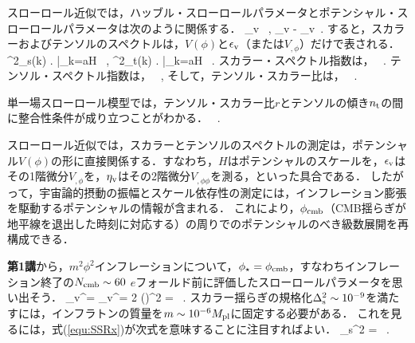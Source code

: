 
スローロール近似では，ハッブル・スローロールパラメータとポテンシャル・スローロールパラメータは次のように関係する．
\beq
\varepsilon \approx \epsilon_{\rm v} \, , \qquad \eta \approx \eta_{\rm v} - \epsilon_{\rm v}\, .
\eeq
すると，スカラーおよびテンソルのスペクトルは，$V(\phi)$と$\epsilon_{\rm v}$（または$V_{,\phi}$）だけで表される．
\beq
\label{equ:SSRx}
\Delta^2_{\rm s}(k) \approx \left.    \right|_{k=aH} \, ,
\qquad
\Delta^2_{\rm t}(k) \approx \left.   \right|_{k=aH} \, .
\eeq
スカラー・スペクトル指数は，
\beq
{}\, .
\eeq
テンソル・スペクトル指数は，
\beq
{}\, ,
\eeq
そして，テンソル・スカラー比は，
\beq
{}\, .
\eeq


単一場スローロール模型では，テンソル・スカラー比$r$とテンソルの傾き$n_{\rm t}$の間に整合性条件が成り立つことがわかる．
\beq
\label{equ:cons:source-duplicate-2}
\, .
\eeq

スローロール近似では，スカラーとテンソルのスペクトルの測定は，ポテンシャル$V(\phi)$の形に直接関係する．すなわち，$H$はポテンシャルのスケールを，$\epsilon_{\rm v}$はその1階微分$V_{,\phi}$を，$\eta_{\rm v}$はその2階微分$V_{,\phi \phi}$を測る，といった具合である．
したがって，宇宙論的摂動の振幅とスケール依存性の測定には，インフレーション膨張を駆動するポテンシャルの情報が含まれる．
これにより，$\phi_{\rm cmb}$（CMB揺らぎが地平線を退出した時刻に対応する）の周りでのポテンシャルのべき級数展開を再構成できる．







{\bf 第1講}から，$m^2 \phi^2$インフレーションについて，$\phi_\star = \phi_{\rm cmb}$，すなわちインフレーション終了の$N_{\rm cmb} \sim 60$ $e$フォールド前に評価したスローロールパラメータを思い出そう．
\beq
\epsilon_{\rm v}^\star = \eta_{\rm v}^\star = 2 \left(\right)^2 = \, .
\eeq
スカラー揺らぎの規格化$\Delta_{\rm s}^2 \sim 10^{-9}$を満たすには，インフラトンの質量を$m\sim 10^{-6} M_{\rm pl}$に固定する必要がある．
これを見るには，式(\ref{equ:SSRx})が次式を意味することに注目すればよい．
\beq
\Delta_{\rm s}^2 =  \, .
\eeq

